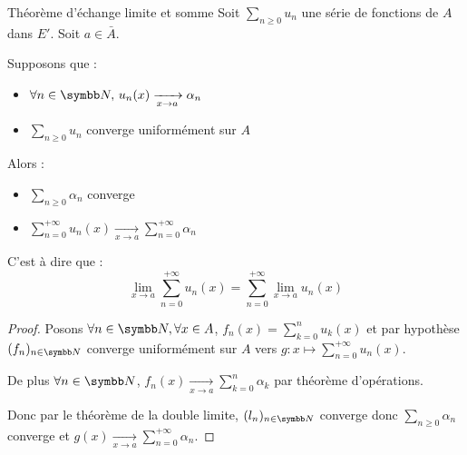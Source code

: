 \begin{theoreme}{Théorème d'échange limite et somme}{}
    Soit $\sum_{n \geqslant 0 } u_n$ une série de fonctions de $A$ dans $E'$. Soit $a \in \bar A$. 

    Supposons que :
    \begin{itemize}
        \item $\forall n \in \N, \, u_n(x) \xrightarrow[x \to a]{} \alpha_n$
        \item $\sum_{n \geqslant 0} u_n$ converge uniformément sur $A$
    \end{itemize}
    Alors : 
    \begin{itemize}
        \item $\displaystyle \sum_{n \geqslant 0} \alpha_n$ converge
        \item $ \displaystyle \sum_{n = 0 }^{+ \infty    } u_n(x) \xrightarrow[x \to a]{} \sum_{n = 0}^{+ \infty} \alpha_n$
    \end{itemize} 

    C'est à dire que :
    $$\lim_{x \to a} \sum_{n = 0}^{+ \infty} u_n(x) = \sum_{n = 0}^{+ \infty} \lim_{x \to a} u_n(x)$$
\end{theoreme}


\begin{proof}
    Posons $\forall n \in \N, \forall x \in A$, $\displaystyle f_n(x) = \sum_{k = 0}^n u_k(x)$ et par hypothèse 
    $(f_n)_{n \in \N}$ converge uniformément sur $A$ vers $\displaystyle g : x \mapsto \sum_{n = 0}^{+ \infty} u_n(x)$.

    De plus $\displaystyle \forall n \in \N$, $\displaystyle f_n(x) \xrightarrow[x \to a]{} \sum_{k = 0}^n \alpha_k$ par théorème d'opérations. 

    Donc par le théorème de la double limite, $(l_n)_{n \in \N}$ converge donc $\displaystyle \sum_{n \geqslant 0} \alpha_n$ converge et 
    $\displaystyle g(x) \xrightarrow[x \to a]{} \sum_{n = 0}^{+ \infty} \alpha_n$.
\end{proof}

